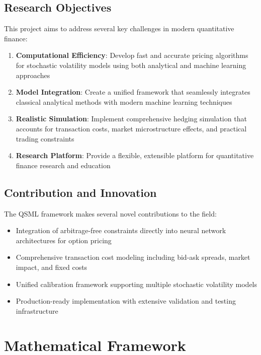 \documentclass[12pt,a4paper]{article}
\begin{document}
\subsection{Research Objectives}

This project aims to address several key challenges in modern quantitative finance:

\begin{enumerate}
    \item \textbf{Computational Efficiency}: Develop fast and accurate pricing algorithms for stochastic volatility models using both analytical and machine learning approaches
    \item \textbf{Model Integration}: Create a unified framework that seamlessly integrates classical analytical methods with modern machine learning techniques
    \item \textbf{Realistic Simulation}: Implement comprehensive hedging simulation that accounts for transaction costs, market microstructure effects, and practical trading constraints
    \item \textbf{Research Platform}: Provide a flexible, extensible platform for quantitative finance research and education
\end{enumerate}

\subsection{Contribution and Innovation}

The QSML framework makes several novel contributions to the field:

\begin{itemize}
    \item Integration of arbitrage-free constraints directly into neural network architectures for option pricing
    \item Comprehensive transaction cost modeling including bid-ask spreads, market impact, and fixed costs
    \item Unified calibration framework supporting multiple stochastic volatility models
    \item Production-ready implementation with extensive validation and testing infrastructure
\end{itemize}

\section{Mathematical Framework}
\end{document}
